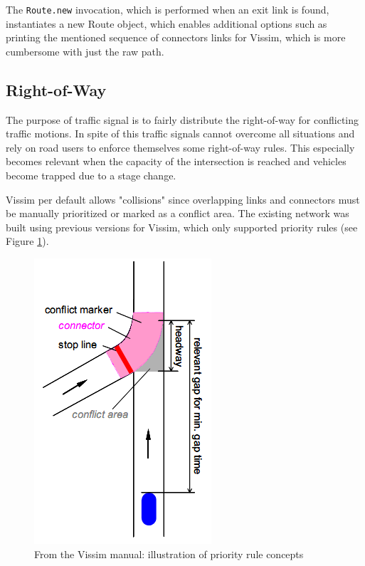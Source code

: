 The \verb|Route.new| invocation, which is performed when an exit link is found, instantiates a new Route object, which enables additional options such as printing the mentioned sequence of connectors links for Vissim, which is more cumbersome with just the raw path.

\subsection{Right-of-Way}
The purpose of traffic signal is to fairly distribute the right-of-way for conflicting traffic motions.  In spite of this traffic signals cannot overcome all situations and rely on road users to enforce themselves some right-of-way rules. This especially becomes relevant when the capacity of the intersection is reached and vehicles become trapped due to a stage change.

Vissim per default allows "collisions" since overlapping links and connectors must be manually prioritized or marked as a conflict area. The existing network was built using previous versions for Vissim, which only supported priority rules (see Figure \ref{fig:priority_rules}). 

\begin{figure}[!ht]
\begin{center}
\includegraphics[scale=0.5]{priority_rules.png} 
\end{center}
\caption{From the Vissim manual: illustration of priority rule concepts}
\label{fig:priority_rules}
\end{figure}

